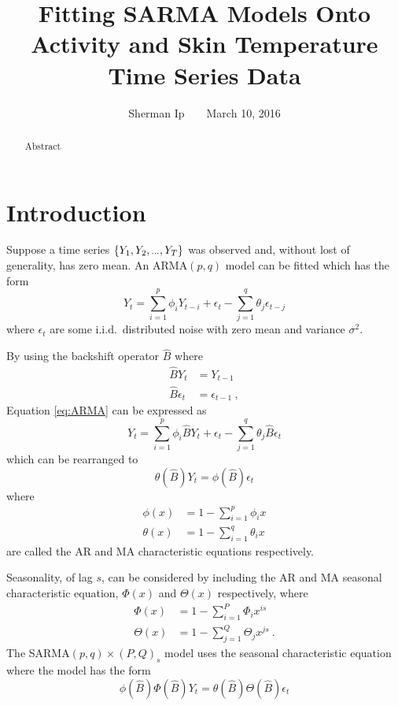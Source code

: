 \documentclass[a4paper]{proc}
\title{Fitting SARMA Models Onto Activity and Skin Temperature Time Series Data}
\author{Sherman Ip$\qquad$March 10, 2016}
\newcommand{\dotdotdot}{\vphantom{.}_{\cdots}}
\newcommand{\backshift}{\widehat{B}}
\begin{document}
\maketitle

\begin{abstract}
Abstract
\end{abstract}

\section{Introduction}
Suppose a time series $\{Y_1,Y_2,\dotdotdot,Y_T\}$ was observed and, without lost of generality, has zero mean. An ARMA$(p,q)$ model can be fitted which has the form
\begin{equation}
Y_t = \sum_{i=1}^{p} \phi_i Y_{t-i} + \epsilon_t - \sum_{j=1}^{q} \theta_{j} \epsilon_{t-j}
\label{eq:ARMA}
\end{equation}
where $\epsilon_t$ are some i.i.d.~distributed noise with zero mean and variance $\sigma^2$.

By using the backshift operator $\backshift$ where
\begin{align}
\backshift Y_t &= Y_{t-1} \\
\backshift \epsilon_t &= \epsilon_{t-1} \ ,
\end{align}
Equation \eqref{eq:ARMA} can be expressed as
\begin{equation}
Y_t = \sum_{i=1}^{p} \phi_i \backshift Y_{t} + \epsilon_t - \sum_{j=1}^{q} \theta_{j} \backshift \epsilon_{t}
\end{equation}
which can be rearranged to
\begin{equation}
\theta\left(\backshift\right)Y_t=\phi\left(\backshift\right)\epsilon_t
\end{equation}
where
\begin{align}
\phi(x)&=1-\sum_{i=1}^{p} \phi_i x \\
\theta(x)&=1-\sum_{i=1}^{q} \theta_i x
\end{align}
are called the AR and MA characteristic equations respectively.

Seasonality, of lag $s$, can be considered by including the AR and MA seasonal characteristic equation, $\Phi(x)$ and $\Theta(x)$ respectively, where
\begin{align}
\Phi(x) &= 1 - \sum_{i=1}^P \Phi_i x^{is} \\
\Theta(x) &= 1 - \sum_{j=1}^Q \Theta_j x^{js} \ .
\end{align}
The SARMA$(p,q)\times(P,Q)_s$ model uses the seasonal characteristic equation where the model has the form
\begin{equation}
\phi\left(\backshift\right)\Phi\left(\backshift\right)Y_t
=
\theta\left(\backshift\right)\Theta\left(\backshift\right)\epsilon_t
\end{equation}
\end{document}
